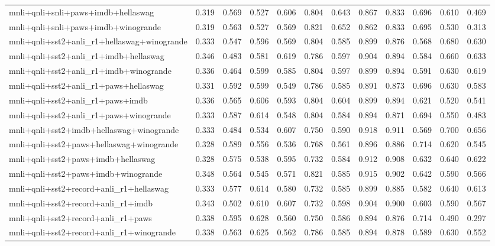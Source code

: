 \begin{table}[t]
\begin{tabular}{lrrrrrrrrrrr}
    mnli+qnli+snli+paws+imdb+hellaswag & 0.319 & 0.569 & 0.527 & 0.606 & 0.804 & 0.643 & 0.867 & 0.833 & 0.696 & 0.610 & 0.469 \\
    mnli+qnli+snli+paws+imdb+winogrande & 0.319 & 0.563 & 0.527 & 0.569 & 0.821 & 0.652 & 0.862 & 0.833 & 0.695 & 0.530 & 0.313 \\
    mnli+qnli+sst2+anli\_r1+hellaswag+winogrande & 0.333 & 0.547 & 0.596 & 0.569 & 0.804 & 0.585 & 0.899 & 0.876 & 0.568 & 0.680 & 0.630 \\
    mnli+qnli+sst2+anli\_r1+imdb+hellaswag & 0.346 & 0.483 & 0.581 & 0.619 & 0.786 & 0.597 & 0.904 & 0.894 & 0.584 & 0.660 & 0.633 \\
    mnli+qnli+sst2+anli\_r1+imdb+winogrande & 0.336 & 0.464 & 0.599 & 0.585 & 0.804 & 0.597 & 0.899 & 0.894 & 0.591 & 0.630 & 0.619 \\
    mnli+qnli+sst2+anli\_r1+paws+hellaswag & 0.331 & 0.592 & 0.599 & 0.549 & 0.786 & 0.585 & 0.891 & 0.873 & 0.696 & 0.630 & 0.583 \\
    mnli+qnli+sst2+anli\_r1+paws+imdb & 0.336 & 0.565 & 0.606 & 0.593 & 0.804 & 0.604 & 0.899 & 0.894 & 0.621 & 0.520 & 0.541 \\
    mnli+qnli+sst2+anli\_r1+paws+winogrande & 0.333 & 0.587 & 0.614 & 0.548 & 0.804 & 0.584 & 0.894 & 0.871 & 0.694 & 0.550 & 0.483 \\
    mnli+qnli+sst2+imdb+hellaswag+winogrande & 0.333 & 0.484 & 0.534 & 0.607 & 0.750 & 0.590 & 0.918 & 0.911 & 0.569 & 0.700 & 0.656 \\
    mnli+qnli+sst2+paws+hellaswag+winogrande & 0.328 & 0.589 & 0.556 & 0.536 & 0.768 & 0.561 & 0.896 & 0.886 & 0.714 & 0.620 & 0.545 \\
    mnli+qnli+sst2+paws+imdb+hellaswag & 0.328 & 0.575 & 0.538 & 0.595 & 0.732 & 0.584 & 0.912 & 0.908 & 0.632 & 0.640 & 0.622 \\
    mnli+qnli+sst2+paws+imdb+winogrande & 0.348 & 0.564 & 0.545 & 0.571 & 0.821 & 0.585 & 0.915 & 0.902 & 0.642 & 0.590 & 0.566 \\
    mnli+qnli+sst2+record+anli\_r1+hellaswag & 0.333 & 0.577 & 0.614 & 0.580 & 0.732 & 0.585 & 0.899 & 0.885 & 0.582 & 0.640 & 0.613 \\
    mnli+qnli+sst2+record+anli\_r1+imdb & 0.343 & 0.502 & 0.610 & 0.607 & 0.732 & 0.598 & 0.904 & 0.900 & 0.603 & 0.590 & 0.567 \\
    mnli+qnli+sst2+record+anli\_r1+paws & 0.338 & 0.595 & 0.628 & 0.560 & 0.750 & 0.586 & 0.894 & 0.876 & 0.714 & 0.490 & 0.297 \\
    mnli+qnli+sst2+record+anli\_r1+winogrande & 0.338 & 0.563 & 0.625 & 0.562 & 0.786 & 0.585 & 0.894 & 0.878 & 0.589 & 0.630 & 0.552 \\

\end{tabular}
\end{table}
